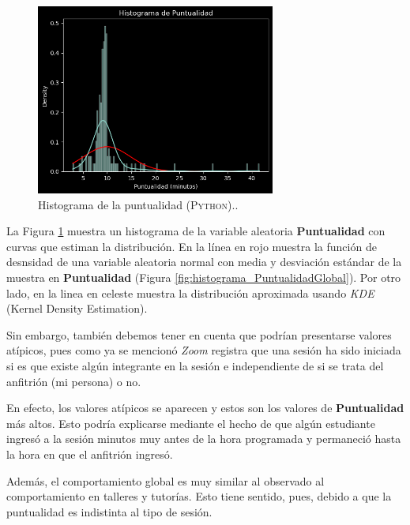 \documentclass[11pt,a4paper]{book}
\theoremstyle{definition}%
\begin{document}
            \begin{figure}[H]
                \centering
                \includegraphics[width=0.7\textwidth]{Sources/histogram_Puntualidad.png}
                \caption{Histograma de la puntualidad (\textsc{Python})..}
                \label{fig:histogram_Puntualidad}
            \end{figure}

            La Figura \ref{fig:histogram_Puntualidad} muestra un histograma de la variable aleatoria \textbf{Puntualidad} con curvas que estiman la distribución. En la línea en rojo muestra la función de desnsidad de una variable aleatoria normal con media y desviación estándar de la muestra en \textbf{Puntualidad} (Figura \ref{fig:histograma_PuntualidadGlobal}). Por otro lado, en la linea en celeste muestra la distribución aproximada usando \textit{KDE} (Kernel Density Estimation).

            Sin embargo, también debemos tener en cuenta que podrían presentarse valores atípicos, pues como ya se mencionó \textit{Zoom} registra que una sesión ha sido iniciada si es que existe algún integrante en la sesión e independiente de si se trata del anfitrión (mi persona) o no.

            En efecto, los valores atípicos se aparecen y estos son los valores de \textbf{Puntualidad} más altos. Esto podría explicarse mediante el hecho de que algún estudiante ingresó a la sesión minutos muy antes de la hora programada y permaneció hasta la hora en que el anfitrión ingresó.

            Además, el comportamiento global es muy similar al observado al comportamiento en talleres y tutorías. Esto tiene sentido, pues, debido a que la puntualidad es indistinta al tipo de sesión.
    
\end{document}
